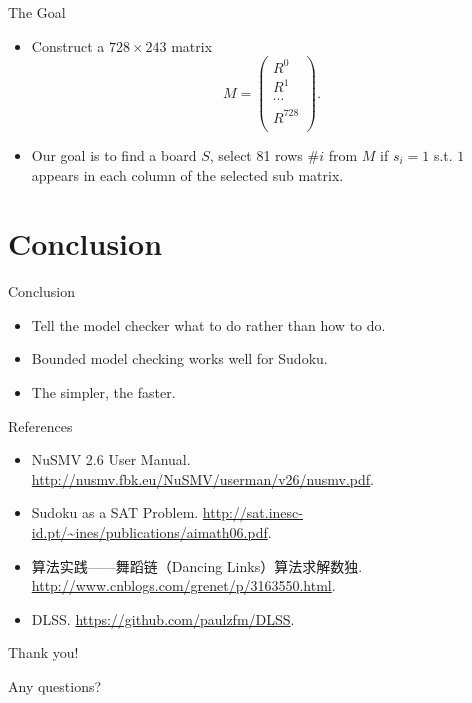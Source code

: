 \documentclass[11pt]{beamer}
\renewcommand{\r}{\alert}
\theoremstyle{definition}
\begin{document}
\begin{frame}{The Goal}
    \begin{itemize}
        \item Construct a $728 \times 243$ matrix $$M = \left(
        \begin{array}{c}
            R^{0} \\
            R^{1} \\
            \cdots \\
            R^{728} \\
        \end{array}\right).$$
        \item Our goal is to find a board $S$, select 81 rows \#$i$ from $M$ if $s_i=1$ s.t. $1$ appears in each column of the selected sub matrix.
    \end{itemize}
\end{frame}

\section{Conclusion}

\begin{frame}{Conclusion}
    \begin{itemize}
        \item Tell the model checker \r{what to do} rather than how to do.
        \item \r{Bounded model checking} works well for Sudoku.
        \item The \r{simpler}, the faster.
    \end{itemize}
\end{frame}

\begin{frame}{References}
    \begin{itemize}
        \item NuSMV 2.6 User Manual. \url{http://nusmv.fbk.eu/NuSMV/userman/v26/nusmv.pdf}.
        \item Sudoku as a SAT Problem. \url{http://sat.inesc-id.pt/~ines/publications/aimath06.pdf}.
        \item 算法实践——舞蹈链（Dancing Links）算法求解数独. \url{http://www.cnblogs.com/grenet/p/3163550.html}.
        \item DLSS. \url{https://github.com/paulzfm/DLSS}.
    \end{itemize}
\end{frame}

\begin{frame}
    \begin{center}
        {\huge \color{darkgreen}
            Thank you!
        }
    \end{center}

    \begin{center}
        {\huge \color{darkgreen}
            Any questions?
        }
    \end{center}
\end{frame}
\end{document}
